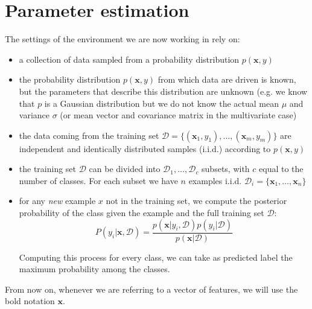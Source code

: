 \chapter{Parameter estimation}

\label{cha:param_estimation}

The settings of the environment we are now working in rely on:
\begin{itemize}
    \item a collection of data sampled from a probability distribution $p(\pmb{x}, y)$
    \item the probability distribution $p(\pmb{x}, y)$ from which data are driven is known, but the parameters that describe this distribution are unknown (e.g. we know that $p$ is a Gaussian distribution but we do not know the actual mean $\mu$ and variance $\sigma$ (or mean vector and covariance matrix in the multivariate case)
    \item the data coming from the training set $\mathcal{D} = \{(\pmb{x}_1, y_1), \dots, (\pmb{x}_m, y_m)\}$ are independent and identically distributed samples (i.i.d.) according to $p(\pmb{x}, y)$
    \item the training set $\mathcal{D}$ can be divided into $\mathcal{D}_1, \dots, \mathcal{D}_c$ subsets, with $c$ equal to the number of classes. For each subset we have $n$ examples i.i.d. $\mathcal{D}_i = \{\pmb{x}_1, \dots, \pmb{x}_n\}$
    \item for any \textit{new} example $x$ not in the training set, we compute the posterior probability of the class given the example and the full training set
    $\mathcal{D}$:
    \begin{equation}
    P(y_i|\pmb{x}, \mathcal{D}) = \frac{p(\pmb{x}|y_i, \mathcal{D})p(y_i|\mathcal{D})}{p(\pmb{x}|\mathcal{D})}
    \label{eq:main_eq}
    \end{equation}
    
    Computing this process for every class, we can take as predicted label the maximum probability among the classes.
\end{itemize}


From now on, whenever we are referring to a vector of features, we will use the bold notation $\pmb{x}$.


